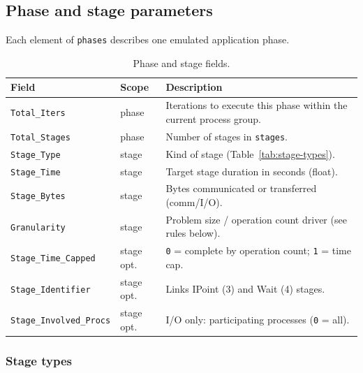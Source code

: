 \subsection{Phase and stage parameters}

Each element of \texttt{phases} describes one emulated application phase.

\begin{table}[H]
\centering
\small
\begin{tabular}{@{}llp{7cm}@{}}
\toprule
\textbf{Field} & \textbf{Scope} & \textbf{Description} \\
\midrule
\texttt{Total\_Iters} & phase & Iterations to execute this phase within the current process group. \\
\texttt{Total\_Stages} & phase & Number of stages in \texttt{stages}. \\
\texttt{Stage\_Type} & stage & Kind of stage (Table~\ref{tab:stage-types}). \\
\texttt{Stage\_Time} & stage & Target stage duration in seconds (float). \\
\texttt{Stage\_Bytes} & stage & Bytes communicated or transferred (comm/I/O). \\
\texttt{Granularity} & stage & Problem size / operation count driver (see rules below). \\
\texttt{Stage\_Time\_Capped} & stage opt. & \texttt{0} = complete by operation count; \texttt{1} = time cap. \\
\texttt{Stage\_Identifier} & stage opt. & Links IPoint (3) and Wait (4) stages. \\
\texttt{Stage\_Involved\_Procs} & stage opt. & I/O only: participating processes (\texttt{0} = all). \\
\bottomrule
\end{tabular}
\caption{Phase and stage fields.}
\label{tab:stage-fields}
\end{table}

\subsubsection{Stage types}
\label{subsubsection:stage-types}

